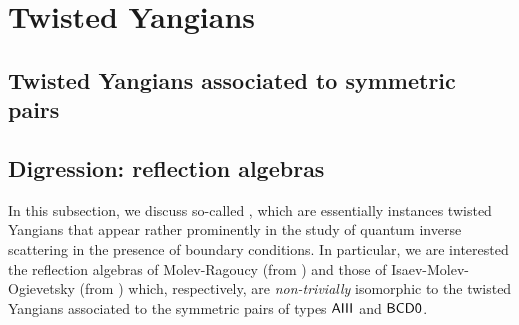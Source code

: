 \section{Twisted Yangians}
    \subsection{Twisted Yangians associated to symmetric pairs}

    \subsection{Digression: reflection algebras}
        In this subsection, we discuss so-called , which are essentially instances twisted Yangians that appear rather prominently in the study of quantum inverse scattering in the presence of boundary conditions. In particular, we are interested the reflection algebras of Molev-Ragoucy (from \cite{molev_ragoucy_representations_of_reflection_algebras}) and those of Isaev-Molev-Ogievetsky (from \cite{isaev_molev_ogievetsky_fusion_for_brauer_algebras_2}) which, respectively, are \textit{non-trivially} isomorphic to the twisted Yangians associated to the symmetric pairs of types $\mathsf{A}\mathsf{III}$ and $\mathsf{B}\mathsf{C}\mathsf{D}\mathsf{0}$.